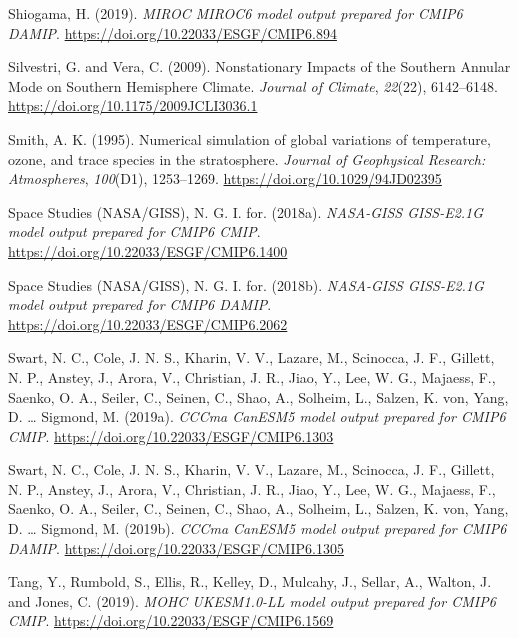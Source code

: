 \documentclass[12pt,oneside,a4paper]{reedthesis}
\newlength{\cslhangindent}
\newenvironment{CSLReferences}[2] %
 {%
  \setlength{\parindent}{0pt}
  \ifodd #1 \everypar{\setlength{\hangindent}{\cslhangindent}}\ignorespaces\fi
  \ifnum #2 > 0
  \setlength{\parskip}{#2\baselineskip}
  \fi
 }%
 {}
\begin{document}
\begin{CSLReferences}{1}{0}
\leavevmode{}%
Shiogama, H. (2019). \emph{MIROC MIROC6 model output prepared for CMIP6 DAMIP}. \url{https://doi.org/10.22033/ESGF/CMIP6.894}

\leavevmode{}%
Silvestri, G. and Vera, C. (2009). Nonstationary {Impacts} of the {Southern Annular Mode} on {Southern Hemisphere Climate}. \emph{Journal of Climate}, \emph{22}(22), 6142--6148. \url{https://doi.org/10.1175/2009JCLI3036.1}

\leavevmode{}%
Smith, A. K. (1995). Numerical simulation of global variations of temperature, ozone, and trace species in the stratosphere. \emph{Journal of Geophysical Research: Atmospheres}, \emph{100}(D1), 1253--1269. \url{https://doi.org/10.1029/94JD02395}

\leavevmode{}%
Space Studies (NASA/GISS), N. G. I. for. (2018a). \emph{NASA-GISS GISS-E2.1G model output prepared for CMIP6 CMIP}. \url{https://doi.org/10.22033/ESGF/CMIP6.1400}

\leavevmode{}%
Space Studies (NASA/GISS), N. G. I. for. (2018b). \emph{NASA-GISS GISS-E2.1G model output prepared for CMIP6 DAMIP}. \url{https://doi.org/10.22033/ESGF/CMIP6.2062}

\leavevmode{}%
Swart, N. C., Cole, J. N. S., Kharin, V. V., Lazare, M., Scinocca, J. F., Gillett, N. P., Anstey, J., Arora, V., Christian, J. R., Jiao, Y., Lee, W. G., Majaess, F., Saenko, O. A., Seiler, C., Seinen, C., Shao, A., Solheim, L., Salzen, K. von, Yang, D. \ldots{} Sigmond, M. (2019a). \emph{CCCma CanESM5 model output prepared for CMIP6 CMIP}. \url{https://doi.org/10.22033/ESGF/CMIP6.1303}

\leavevmode{}%
Swart, N. C., Cole, J. N. S., Kharin, V. V., Lazare, M., Scinocca, J. F., Gillett, N. P., Anstey, J., Arora, V., Christian, J. R., Jiao, Y., Lee, W. G., Majaess, F., Saenko, O. A., Seiler, C., Seinen, C., Shao, A., Solheim, L., Salzen, K. von, Yang, D. \ldots{} Sigmond, M. (2019b). \emph{CCCma CanESM5 model output prepared for CMIP6 DAMIP}. \url{https://doi.org/10.22033/ESGF/CMIP6.1305}

\leavevmode{}%
Tang, Y., Rumbold, S., Ellis, R., Kelley, D., Mulcahy, J., Sellar, A., Walton, J. and Jones, C. (2019). \emph{MOHC UKESM1.0-LL model output prepared for CMIP6 CMIP}. \url{https://doi.org/10.22033/ESGF/CMIP6.1569}


\end{CSLReferences}
\end{document}
